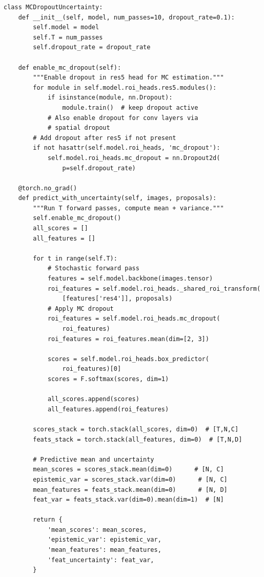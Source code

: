\documentclass[11pt,a4paper]{article}
\begin{document}
\begin{lstlisting}[caption={MC-Dropout uncertainty estimation}]
class MCDropoutUncertainty:
    def __init__(self, model, num_passes=10, dropout_rate=0.1):
        self.model = model
        self.T = num_passes
        self.dropout_rate = dropout_rate

    def enable_mc_dropout(self):
        """Enable dropout in res5 head for MC estimation."""
        for module in self.model.roi_heads.res5.modules():
            if isinstance(module, nn.Dropout):
                module.train()  # keep dropout active
            # Also enable dropout for conv layers via
            # spatial dropout
        # Add dropout after res5 if not present
        if not hasattr(self.model.roi_heads, 'mc_dropout'):
            self.model.roi_heads.mc_dropout = nn.Dropout2d(
                p=self.dropout_rate)

    @torch.no_grad()
    def predict_with_uncertainty(self, images, proposals):
        """Run T forward passes, compute mean + variance."""
        self.enable_mc_dropout()
        all_scores = []
        all_features = []

        for t in range(self.T):
            # Stochastic forward pass
            features = self.model.backbone(images.tensor)
            roi_features = self.model.roi_heads._shared_roi_transform(
                [features['res4']], proposals)
            # Apply MC dropout
            roi_features = self.model.roi_heads.mc_dropout(
                roi_features)
            roi_features = roi_features.mean(dim=[2, 3])

            scores = self.model.roi_heads.box_predictor(
                roi_features)[0]
            scores = F.softmax(scores, dim=1)

            all_scores.append(scores)
            all_features.append(roi_features)

        scores_stack = torch.stack(all_scores, dim=0)  # [T,N,C]
        feats_stack = torch.stack(all_features, dim=0)  # [T,N,D]

        # Predictive mean and uncertainty
        mean_scores = scores_stack.mean(dim=0)      # [N, C]
        epistemic_var = scores_stack.var(dim=0)      # [N, C]
        mean_features = feats_stack.mean(dim=0)      # [N, D]
        feat_var = feats_stack.var(dim=0).mean(dim=1)  # [N]

        return {
            'mean_scores': mean_scores,
            'epistemic_var': epistemic_var,
            'mean_features': mean_features,
            'feat_uncertainty': feat_var,
        }
\end{lstlisting}
\end{document}
